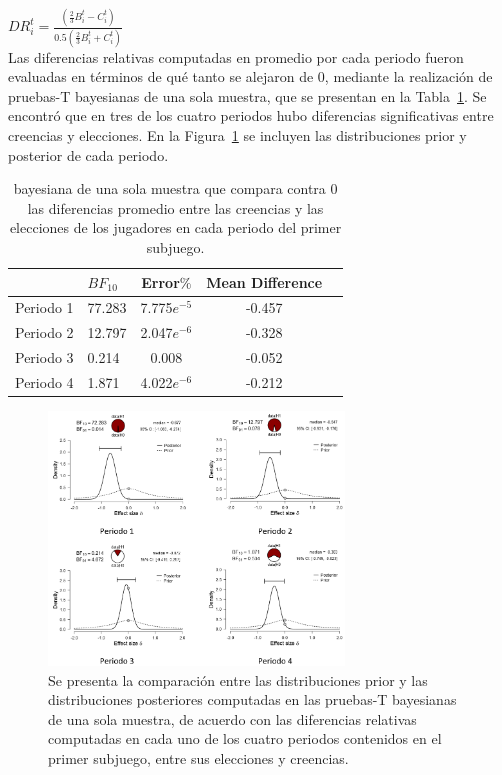 $DR_i^t= \frac{(\frac{2}{3}B_i^t - C_i^t)}{0.5(\frac{2}{3}B_i^t + C_i^t)}$\\


Las diferencias relativas computadas en promedio por cada periodo fueron evaluadas en términos de qué tanto se alejaron de $0$, mediante la realización de pruebas-T bayesianas de una sola muestra, que se presentan en la Tabla~\ref{DR_Sub1}. Se encontró que en tres de los cuatro periodos hubo diferencias significativas entre creencias y elecciones. En la Figura~\ref{fig:DiferenciasRelativas_Subjuego1} se incluyen las distribuciones prior y posterior de cada periodo.

\begin{table}
\caption[Diferencias Relativas en el Subjuego 1]{bayesiana de una sola muestra que compara contra 0 las diferencias promedio entre las creencias y las elecciones de los jugadores en cada periodo del primer subjuego.}
\label{DR_Sub1}
\centering
\begin{tabular}{l l | c c c}  %
\toprule
\textbf{} & \textbf{$BF_{10}$} & \textbf{Error$\%$} & \textbf{Mean Difference}\\
\midrule
Periodo 1 & 77.283 & 7.775$e^{-5}$ & -0.457 \\
Periodo 2 & 12.797 & 2.047$e^{-6}$ & -0.328 \\
Periodo 3 & 0.214 & 0.008 & -0.052 \\
Periodo 4 & 1.871 & 4.022$e^{-6}$ & -0.212 \\
\bottomrule
\end{tabular}
\end{table}

\begin{figure}[th]
\centering
\includegraphics[width=0.70\textwidth]{Figures/Fig_3} 
\caption[Distribuciones prior y posterior de las Diferencias Relativas en el primer Subjuego, (prueba T bayesiana de una muestra)]{Se presenta la comparación entre las distribuciones prior y las distribuciones posteriores computadas en las pruebas-T bayesianas de una sola muestra, de acuerdo con las diferencias relativas computadas en cada uno de los cuatro periodos contenidos en el primer subjuego, entre sus elecciones y creencias.}
\label{fig:DiferenciasRelativas_Subjuego1}
\end{figure}

